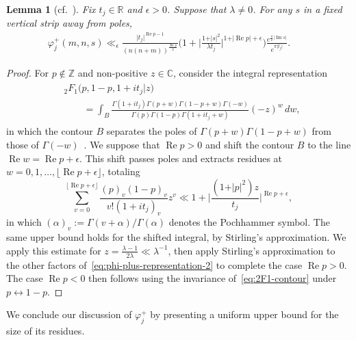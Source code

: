 \documentclass[11pt,reqno]{amsart}
\theoremstyle{plain}
\newtheorem{lemma}[theorem]{Lemma}
\theoremstyle{definition}
\numberwithin{equation}{section}
\renewcommand{\Im}{\operatorname{Im}}
\renewcommand{\Re}{\operatorname{Re}}
\begin{document}
\begin{lemma}[{cf.~\cite[p.452]{Jutila97}}]
Fix $t_j \in \mathbb{R}$ and $\epsilon > 0$. Suppose that $\lambda \neq 0$. For any $s$ in a fixed vertical strip away from poles,
\begin{align} \label{eq:phi-plus-upper-bound-2}
	\varphi_j^+(m,n,s) \ll_{\epsilon} 
		\frac{\vert t_j \vert^{\Re p - 1}}{(n(n+m))^{\frac{\Re p}{2}}}
	\Big( 1 + \Big\vert \frac{1+ \vert s\vert^2}{\lambda t_j} \Big\vert^{1+\vert \Re p \vert+\epsilon}\Big)
	\frac{e^{\frac{\pi}{2} \vert \Im s \vert}}{e^{\pi \vert t_j \vert}}. \qquad
\end{align}
\end{lemma}

\begin{proof} For $p \notin \mathbb{Z}$ and non-positive $z \in \mathbb{C}$, consider the integral representation
\begin{align} 
\begin{split} \label{eq:2F1-contour}
	& {}_2F_1\Big(p, 1-p, 1+it_j
						\Big\vert z \Big) \\
	& \qquad 
		= \int_B 
			\frac{\Gamma(1+it_j)\Gamma(p+w)\Gamma(1-p+w)\Gamma(-w)}{\Gamma(p)\Gamma(1-p)\Gamma(1+it_j + w)}
			(-z)^w \, dw,
\end{split}
\end{align}
in which the contour $B$ separates the poles of $\Gamma(p+w)\Gamma(1-p+w)$ from those of $\Gamma(-w)$~\cite[(15.6.6)]{DLMF}. We suppose that $\Re p  > 0$ and shift the contour $B$ to the line $\Re w = \Re p + \epsilon$. This shift passes poles and extracts residues at $w = 0,1,\ldots, \lfloor \Re p + \epsilon \rfloor$, totaling
\[
	\sum_{v=0}^{\lfloor \Re p + \epsilon \rfloor} 
		\frac{(p)_v (1-p)_v}{v! (1+it_j)_v} z^v
	\ll 1 + \Big\vert \frac{(1+ \vert p\vert^2) z}{t_j} \Big\vert^{\Re p + \epsilon},
\]
in which $(\alpha)_v := \Gamma(v+\alpha)/\Gamma(\alpha)$ denotes the Pochhammer symbol. The same upper bound holds for the shifted integral, by Stirling's approximation. We apply this estimate for $z = \frac{\lambda -1}{2\lambda} \ll \lambda^{-1}$, then apply Stirling's approximation to the other factors of~\eqref{eq:phi-plus-representation-2} to complete the case $\Re p > 0$.
The case $\Re p < 0$ then follows using the invariance of~\eqref{eq:2F1-contour} under $p \leftrightarrow 1-p$.
\end{proof}

We conclude our discussion of $\varphi_j^+$ by presenting a uniform upper bound for the size of its residues.
\end{document}
